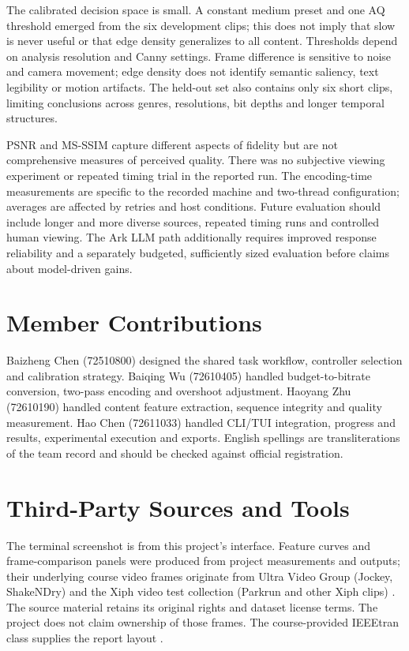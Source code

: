 \documentclass[conference]{IEEEtran}
\begin{document}
The calibrated decision space is small. A constant medium preset and one AQ threshold emerged from the six development clips; this does not imply that slow is never useful or that edge density generalizes to all content. Thresholds depend on analysis resolution and Canny settings. Frame difference is sensitive to noise and camera movement; edge density does not identify semantic saliency, text legibility or motion artifacts. The held-out set also contains only six short clips, limiting conclusions across genres, resolutions, bit depths and longer temporal structures.

PSNR and MS-SSIM capture different aspects of fidelity but are not comprehensive measures of perceived quality. There was no subjective viewing experiment or repeated timing trial in the reported run. The encoding-time measurements are specific to the recorded machine and two-thread configuration; averages are affected by retries and host conditions. Future evaluation should include longer and more diverse sources, repeated timing runs and controlled human viewing. The Ark LLM path additionally requires improved response reliability and a separately budgeted, sufficiently sized evaluation before claims about model-driven gains.

\section{Member Contributions}
Baizheng Chen (72510800) designed the shared task workflow, controller selection and calibration strategy. Baiqing Wu (72610405) handled budget-to-bitrate conversion, two-pass encoding and overshoot adjustment. Haoyang Zhu (72610190) handled content feature extraction, sequence integrity and quality measurement. Hao Chen (72611033) handled CLI/TUI integration, progress and results, experimental execution and exports. English spellings are transliterations of the team record and should be checked against official registration.

\section{Third-Party Sources and Tools}
The terminal screenshot is from this project's interface. Feature curves and frame-comparison panels were produced from project measurements and outputs; their underlying course video frames originate from Ultra Video Group (Jockey, ShakeNDry) and the Xiph video test collection (Parkrun and other Xiph clips) \cite{uvg,xiph}. The source material retains its original rights and dataset license terms. The project does not claim ownership of those frames. The course-provided IEEEtran class supplies the report layout \cite{ieee}.
\end{document}
